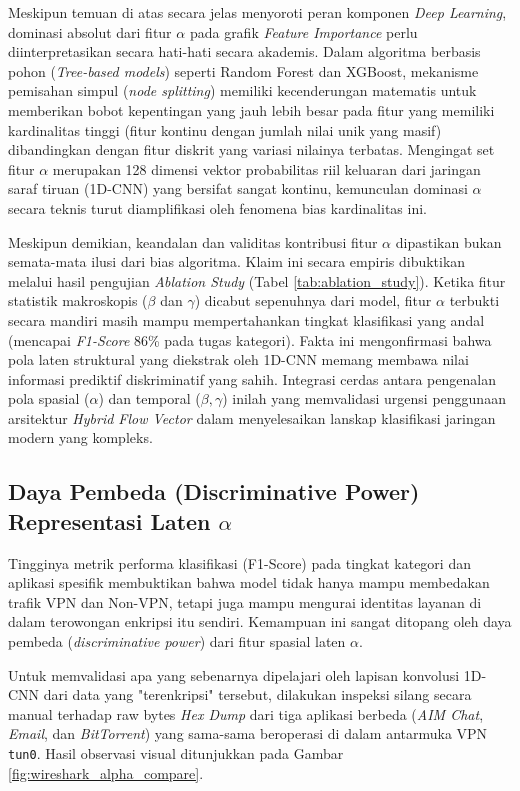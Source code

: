 Meskipun temuan di atas secara jelas menyoroti peran komponen \textit{Deep Learning}, dominasi absolut dari fitur $\alpha$ pada grafik \textit{Feature Importance} perlu diinterpretasikan secara hati-hati secara akademis. Dalam algoritma berbasis pohon (\textit{Tree-based models}) seperti Random Forest dan XGBoost, mekanisme pemisahan simpul (\textit{node splitting}) memiliki kecenderungan matematis untuk memberikan bobot kepentingan yang jauh lebih besar pada fitur yang memiliki kardinalitas tinggi (fitur kontinu dengan jumlah nilai unik yang masif) dibandingkan dengan fitur diskrit yang variasi nilainya terbatas. Mengingat set fitur $\alpha$ merupakan 128 dimensi vektor probabilitas riil keluaran dari jaringan saraf tiruan (1D-CNN) yang bersifat sangat kontinu, kemunculan dominasi $\alpha$ secara teknis turut diamplifikasi oleh fenomena bias kardinalitas ini.

Meskipun demikian, keandalan dan validitas kontribusi fitur $\alpha$ dipastikan bukan semata-mata ilusi dari bias algoritma. Klaim ini secara empiris dibuktikan melalui hasil pengujian \textit{Ablation Study} (Tabel \ref{tab:ablation_study}). Ketika fitur statistik makroskopis ($\beta$ dan $\gamma$) dicabut sepenuhnya dari model, fitur $\alpha$ terbukti secara mandiri masih mampu mempertahankan tingkat klasifikasi yang andal (mencapai \textit{F1-Score} 86\% pada tugas kategori). Fakta ini mengonfirmasi bahwa pola laten struktural yang diekstrak oleh 1D-CNN memang membawa nilai informasi prediktif diskriminatif yang sahih. Integrasi cerdas antara pengenalan pola spasial ($\alpha$) dan temporal ($\beta, \gamma$) inilah yang memvalidasi urgensi penggunaan arsitektur \textit{Hybrid Flow Vector} dalam menyelesaikan lanskap klasifikasi jaringan modern yang kompleks.

\subsection{Daya Pembeda (Discriminative Power) Representasi Laten \texorpdfstring{$\alpha$}{alpha}}

Tingginya metrik performa klasifikasi (F1-Score) pada tingkat kategori dan aplikasi spesifik membuktikan bahwa model tidak hanya mampu membedakan trafik VPN dan Non-VPN, tetapi juga mampu mengurai identitas layanan di dalam terowongan enkripsi itu sendiri. Kemampuan ini sangat ditopang oleh daya pembeda (\textit{discriminative power}) dari fitur spasial laten $\alpha$.

Untuk memvalidasi apa yang sebenarnya dipelajari oleh lapisan konvolusi 1D-CNN dari data yang "terenkripsi" tersebut, dilakukan inspeksi silang secara manual terhadap raw bytes \textit{Hex Dump} dari tiga aplikasi berbeda (\textit{AIM Chat}, \textit{Email}, dan \textit{BitTorrent}) yang sama-sama beroperasi di dalam antarmuka VPN \texttt{tun0}. Hasil observasi visual ditunjukkan pada Gambar \ref{fig:wireshark_alpha_compare}.

